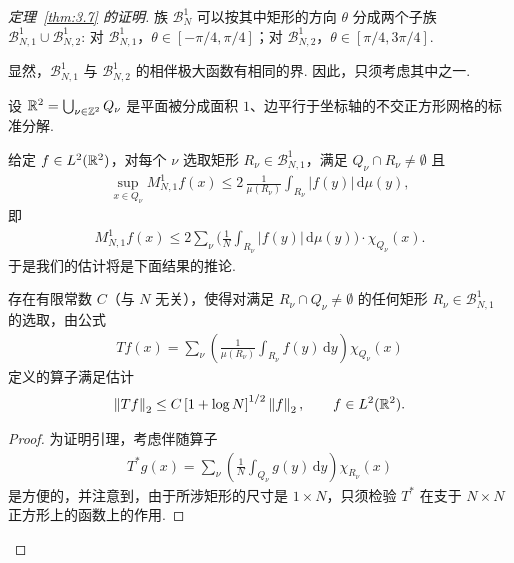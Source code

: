 \begin{proof}[定理~\ref{thm:3.7} 的证明]
族 $\mathcal{B}_N^1$ 可以按其中矩形的方向 $\theta$ 分成两个子族 $\mathcal{B}_{N,1}^1 \cup \mathcal{B}_{N,2}^1$: 对 $\mathcal{B}_{N,1}^1$，$\theta \in [-\pi/4, \pi/4]$；对 $\mathcal{B}_{N,2}^1$，$\theta \in [\pi/4, 3\pi/4]$.

显然，$\mathcal{B}_{N,1}^{1}$ 与 $\mathcal{B}_{N,2}^{1}$ 的相伴极大函数有相同的界. 因此，只须考虑其中之一.

设 $\mathbb{R}^2 = \bigcup_{\nu \in \mathbb{Z}^2} Q_\nu$ 是平面被分成面积 $1$、边平行于坐标轴的不交正方形网格的标准分解.

给定 $f \in L^2(\mathbb{R}^2)$，对每个 $\nu$ 选取矩形 $R_\nu \in \mathcal{B}_{N,1}^1$，满足 $Q_\nu \cap R_\nu \neq \emptyset$ 且
\begin{align*}
  \sup_{x\in Q_{\nu}}M_{N,1}^{1}f(x)\leq 2\,\frac{1}{\mu(R_{\nu})}\int_{R_{\nu}}\left|f(y)\right|\,\mathrm{d}\mu(y),
\end{align*}
即
\begin{align*}
  M_{N,1}^{1}f(x)\leq 2\sum_{\nu}\Big(\frac{1}{N}\int_{R_{\nu}}|f(y)|\,\mathrm{d}\mu(y)\Big)\cdot\chi_{Q_{\nu}}(x).
\end{align*}
于是我们的估计将是下面结果的推论.

\begin{lemma}\label{lem:3.9}
存在有限常数 $C$（与 $N$ 无关），使得对满足 $R_\nu \cap Q_\nu \neq \emptyset$ 的任何矩形 $R_\nu \in \mathcal{B}_{N,1}^1$ 的选取，由公式
\begin{align*}
  T f(x)=\sum_{\nu}\left(\frac{1}{\mu(R_{\nu})}\int_{R_{\nu}}f(y)\,\mathrm{d}y\right)\chi_{Q_{\nu}}(x)
\end{align*}
定义的算子满足估计
\begin{align*}
  \left\|T f\right\|_{2}\leq C\left[1+\log N\right]^{1/2}\left\|f\right\|_{2},\qquad f\in L^{2}(\mathbb{R}^{2}).
\end{align*}
\end{lemma}

\begin{proof}
为证明引理，考虑伴随算子
\begin{align*}
  T^{*}g(x)=\sum_{\nu}\left(\frac{1}{N}\int_{Q_{\nu}}g(y)\,\mathrm{d}y\right)\chi_{R_{\nu}}(x)
\end{align*}
是方便的，并注意到，由于所涉矩形的尺寸是 $1 \times N$，只须检验 $T^*$ 在支于 $N \times N$ 正方形上的函数上的作用.


\end{proof}
\end{proof}
